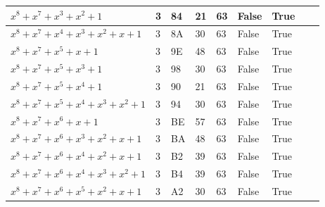 \begin{footnotesize}
\begin{longtable}{|l|l|l|l|l|l|l|l|l|}
$x^8 + x^7 + x^3 + x^2 + 1$             & 3             & 84                & 21                  & 63                    & False               & True              &              &                \\ \hline
$x^8 + x^7 + x^4 + x^3 + x^2 + x + 1$   & 3             & 8A                & 30                  & 63                    & False               & True              &              &                \\ \hline
$x^8 + x^7 + x^5 + x + 1$               & 3             & 9E                & 48                  & 63                    & False               & True              &              &                \\ \hline
$x^8 + x^7 + x^5 + x^3 + 1$             & 3             & 98                & 30                  & 63                    & False               & True              &              &                \\ \hline
$x^8 + x^7 + x^5 + x^4 + 1$             & 3             & 90                & 21                  & 63                    & False               & True              &              &                \\ \hline
$x^8 + x^7 + x^5 + x^4 + x^3 + x^2 + 1$ & 3             & 94                & 30                  & 63                    & False               & True              &              &                \\ \hline
$x^8 + x^7 + x^6 + x + 1$               & 3             & BE                & 57                  & 63                    & False               & True              &              &                \\ \hline
$x^8 + x^7 + x^6 + x^3 + x^2 + x + 1$   & 3             & BA                & 48                  & 63                    & False               & True              &              &                \\ \hline
$x^8 + x^7 + x^6 + x^4 + x^2 + x + 1$   & 3             & B2                & 39                  & 63                    & False               & True              &              &                \\ \hline
$x^8 + x^7 + x^6 + x^4 + x^3 + x^2 + 1$ & 3             & B4                & 39                  & 63                    & False               & True              &              &                \\ \hline
$x^8 + x^7 + x^6 + x^5 + x^2 + x + 1$   & 3             & A2                & 30                  & 63                    & False               & True              &              &                \\ \hline

\end{longtable}
\end{footnotesize}

